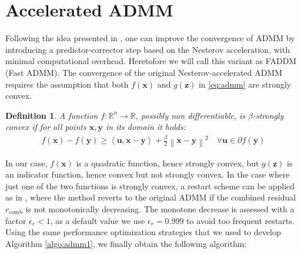 \documentclass[final,3p]{elsarticle}
\newcommand{\vect}[1]{\bm{#1}}
\newcommand{\norm}[1]{\left\lVert#1\right\rVert}
\newtheorem{definition}{Definition}
\begin{document}
\section{Accelerated ADMM}

Following the idea presented in \cite{Goldstein2014}, one can improve the convergence of ADMM by introducing a predictor-corrector step based on the Nesterov acceleration, with minimal computational overhead. Heretofore we will call this variant as FADDM (Fast ADMM). 
The convergence of the original Nesterov-accelerated ADMM requires the assumption that both $f(\vect{x})$ and $g(\vect{z})$ in \eqref{eq:admm} are strongly convex.

\begin{definition}
A function $f: \mathbb{R}^n \rightarrow \mathbb{R}$, possibly non differentiable, is \textit{$\beta$-strongly convex} if for all points $\vect{x},\vect{y}$ in its domain it holds:
\begin{align}
\label{eq:strongconvex}
f(\vect{x}) - f(\vect{y}) \geq \left\langle \vect{u}, \vect{x} - \vect{y}  \right\rangle + \frac{\beta}{2} \norm{ \vect{x} - \vect{y} }^2
 \quad \forall \vect{u} \in \partial f(\vect{y})
\end{align}
\end{definition}

In our case, $f(\vect{x})$ is a quadratic function, hence strongly convex, but $g(\vect{z})$ is an indicator function, hence convex but not strongly convex. In the case where just one of the two functions is strongly convex, a restart scheme can be applied as in \cite{Goldstein2014}, where the method reverts to the original ADMM if the combined residual $r_{\text{comb}}$ is not monotonically decreasing. The monotone decrease is assessed with a factor $\epsilon_r < 1$, as a default value we use 
$\epsilon_r =0.999$ to avoid too frequent restarts. 
Using the same performance optimization strategies that we used to develop Algorithm \ref{algo:admm1}, we finally obtain the following algorithm:
\end{document}
